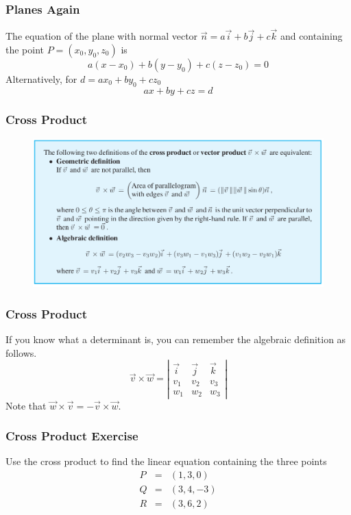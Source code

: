 \documentclass[xcolor=dvipsnames]{beamer}
\begin{document}
\begin{frame}
  \frametitle{Planes Again}
  The equation of the plane with normal vector
  $\vec{n}=a\vec{i}+b\vec{j}+c\vec{k}$ and containing the point
  $P=(x_{0},y_{0},z_{0})$ is
  \begin{equation}
    \label{eq:ijaeriri}
    a(x-x_{0})+b(y-y_{0})+c(z-z_{0})=0
  \end{equation}
  Alternatively, for $d=ax_{0}+by_{0}+cz_{0}$
  \begin{equation}
    \label{eq:bamoyeez}
    ax+by+cz=d
  \end{equation}
\end{frame}

\begin{frame}
  \frametitle{Cross Product}
  \begin{figure}[h]
    \includegraphics[scale=0.32]{./diagrams/crossproduct.png}
  \end{figure}
\end{frame}

\begin{frame}
  \frametitle{Cross Product}
  If you know what a determinant is, you can remember the algebraic
  definition as follows.
  \begin{equation}
    \label{eq:abeekohc}
    \vec{v}\times\vec{w}=\left\vert
      \begin{array}{ccc}
        \vec{i} & \vec{j} & \vec{k} \\
        v_{1} & v_{2} & v_{3} \\
        w_{1} & w_{2} & w_{3}
      \end{array}\right\vert
  \end{equation}
  Note that $\vec{w}\times\vec{v}=-\vec{v}\times\vec{w}$.
\end{frame}

\begin{frame}
  \frametitle{Cross Product Exercise}
  {\ubung} Use the cross product to find the linear equation containing the
  three points
  \begin{equation}
    \label{eq:eiyeigaz}
    \begin{array}{rcl}
      P&=&(1,3,0) \\
      Q&=&(3,4,-3) \\
      R&=&(3,6,2)
    \end{array}
  \end{equation}
\end{frame}
\end{document}
